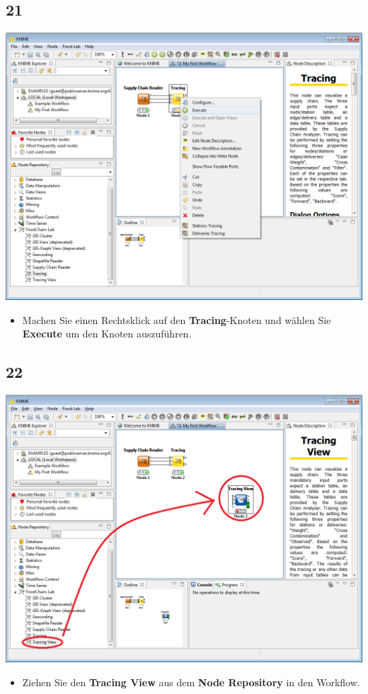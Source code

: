 \documentclass{beamer}
\begin{document}
\subsection{21}
\begin{frame}
	\begin{center}
  		\includegraphics[height=0.6\textheight]{21.png}
	\end{center}
	\begin{itemize}
		\item Machen Sie einen Rechtsklick auf den \textbf{Tracing}-Knoten und wählen Sie \textbf{Execute} um den Knoten auszuführen.
	\end{itemize}
\end{frame}

\subsection{22}
\begin{frame}
	\begin{center}
  		\includegraphics[height=0.6\textheight]{22.png}
	\end{center}
	\begin{itemize}
		\item Ziehen Sie den \textbf{Tracing View} aus dem \textbf{Node Repository} in den Workflow.
	\end{itemize}
\end{frame}
\end{document}
